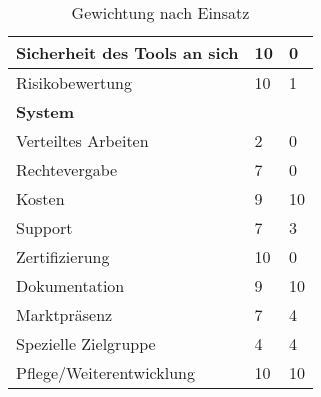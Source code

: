 \begin{itemize}
\begin{table}[h!tb]
\begin{tabular}{|p{}|p{}|p{}|}
		\hline
		Sicherheit des Tools an sich & 10 & 0\\
		\hline
		Risikobewertung & 10 & 1 \\
		\hline
		\textbf{System}& & \\
		\hline
		Verteiltes Arbeiten & 2 & 0 \\
		\hline
		Rechtevergabe & 7 & 0 \\
		\hline
		Kosten & 9 & 10\\
		\hline
		Support & 7 & 3 \\
		\hline
		Zertifizierung & 10 & 0 \\
		\hline
		Dokumentation & 9 & 10 \\
		\hline
		Marktpräsenz & 7 & 4 \\
		\hline
		Spezielle Zielgruppe & 4 & 4 \\
		\hline
		Pflege/Weiterentwicklung & 10 & 10 \\
		\hline
		
	\end{tabular} 
	\caption{Gewichtung nach Einsatz}
	\label{tab:gewichtung}
\end{table}
\end{itemize}
